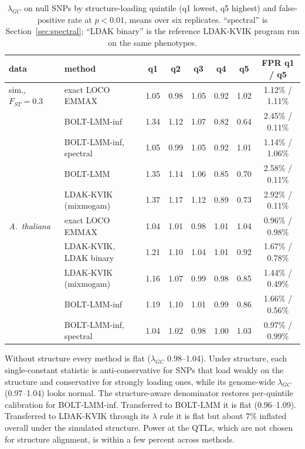 \documentclass[11pt]{article}
\begin{document}
\begin{table}[h]
\centering
\small
\caption{$\lambda_{GC}$ on null SNPs by structure-loading quintile
(q1 lowest, q5 highest) and false-positive rate at $p < 0.01$, means over
six replicates. ``spectral'' is Section~\ref{sec:spectral}; ``LDAK
binary'' is the reference LDAK-KVIK program run on the same phenotypes.}
\label{tab:structure}
\setlength{\tabcolsep}{4pt}
\begin{tabular}{@{}llccccc c@{}}
\toprule
data & method & q1 & q2 & q3 & q4 & q5 & FPR q1 / q5 \\
\midrule
sim., $F_{ST} = 0.3$ & exact LOCO EMMAX & 1.05 & 0.98 & 1.05 & 0.92 & 1.02 & 1.12\% / 1.11\% \\
 & BOLT-LMM-inf & 1.34 & 1.12 & 1.07 & 0.82 & 0.64 & 2.45\% / 0.11\% \\
 & BOLT-LMM-inf, spectral & 1.05 & 0.99 & 1.05 & 0.92 & 1.01 & 1.14\% / 1.06\% \\
 & BOLT-LMM & 1.35 & 1.14 & 1.06 & 0.85 & 0.70 & 2.58\% / 0.11\% \\
 & LDAK-KVIK (mixmogam) & 1.37 & 1.17 & 1.12 & 0.89 & 0.73 & 2.92\% / 0.11\% \\
\midrule
\emph{A.\ thaliana} & exact LOCO EMMAX & 1.04 & 1.01 & 0.98 & 1.01 & 1.04 & 0.96\% / 0.98\% \\
 & LDAK-KVIK, LDAK binary & 1.21 & 1.10 & 1.04 & 1.01 & 0.92 & 1.67\% / 0.78\% \\
 & LDAK-KVIK (mixmogam) & 1.16 & 1.07 & 0.99 & 0.98 & 0.85 & 1.44\% / 0.49\% \\
 & BOLT-LMM-inf & 1.19 & 1.10 & 1.01 & 0.99 & 0.86 & 1.66\% / 0.56\% \\
 & BOLT-LMM-inf, spectral & 1.04 & 1.02 & 0.98 & 1.00 & 1.03 & 0.97\% / 0.99\% \\
\bottomrule
\end{tabular}
\end{table}

Without structure every method is flat ($\lambda_{GC}$ 0.98--1.04). Under
structure, each single-constant statistic is anti-conservative for SNPs
that load weakly on the structure and conservative for strongly loading
ones, while its genome-wide $\lambda_{GC}$ (0.97--1.04) looks normal. The
structure-aware denominator restores per-quintile calibration for
BOLT-LMM-inf. Transferred to BOLT-LMM it is flat (0.96--1.09). Transferred
to LDAK-KVIK through its $\lambda$ rule it is flat but about 7\% inflated
overall under the simulated structure. Power at the QTLs, which are not
chosen for structure alignment, is within a few percent across methods.
\end{document}
